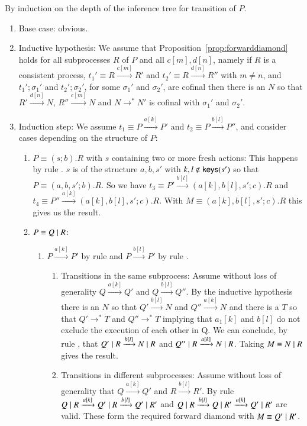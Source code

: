\begin{pf}
By induction on the depth of the inference tree for transition of $P$.
\begin{enumerate}
\item Base case: obvious.
\item Inductive hypothesis: We assume that Proposition~\ref{prop:forwarddiamond} holds for all 
subprocesses $R$ of $P$ and all $c[m], d[n]$, namely if $R$ is a consistent process, 
$t_1' \equiv R \xrightarrow{c[m]} R'$ and $t_2' \equiv R \xrightarrow{d[n]} R''$ with $m \neq n$, 
and $t_1';\sigma_1'$ and $t_2';\sigma_2'$, for some $\sigma_1'$ and $\sigma_2'$, are cofinal  then there is an $N$ so that $R' \xrightarrow{d[n]} N$, $R'' \xrightarrow{c[m]} N$ and $N \rightarrow^* N'$ is cofinal with $\sigma_1'$ and $\sigma_2'$.
\item Induction step:  We assume $t_1 \equiv P \xrightarrow{a[k]} P'$ and 
$t_2 \equiv P \xrightarrow{b[l]} P''$, and consider cases depending on the structure of $P$:
\begin{enumerate}
\item $P\equiv (s;b).R$ with $s$ containing two or more fresh actions: This happens by rule . $s$ is
of the structure $a,b,s'$ with $k,l \notin \mathsf{keys}(s')$ so that $P\equiv (a,b,s';b).R$. So we have 
$t_3 \equiv P' \xrightarrow{b[l]} (a[k],b[l],s';c).R$ and $t_4 \equiv P'' \xrightarrow{a[k]} 
(a[k],b[l],s';c).R$. With $M \equiv (a[k],b[l],s';c).R$ this gives us the result.
\item $P\equiv Q \; \vert \; R$:
\begin{enumerate}
\item $P \xrightarrow{a[k]} P'$ by rule  and $P \xrightarrow{b[l]} P'$ by rule . 
\begin{enumerate}
\item Transitions in the same subprocess: Assume without loss of generality $Q \xrightarrow{a[k]} Q'$ and $Q \xrightarrow{b[l]} Q''$. By the inductive hypothesis there is an $N$ so that $Q' \xrightarrow{b[l]} N$ and $Q'' \xrightarrow{a[k]} N$ and there is a $T$ so that $Q' \rightarrow^* T$ and $Q'' \rightarrow^* T$ implying that $a_1[k]$ and $b[l]$ do not exclude the execution of each other in Q. We can conclude,
by rule , that $Q' \; \vert \; R \xrightarrow{b[l]} N \; \vert \; R$ and $Q'' \; \vert \; R \xrightarrow{a[k]} N \; \vert \; R$. Taking $M \equiv N \; \vert \; R$ gives the result.
\item Transitions in different subprocesses: Assume without loss of generality that $Q \xrightarrow{a[k]} Q'$ and $R \xrightarrow{b[l]} R'$. By rule  $Q \; \vert \; R \xrightarrow{a[k]} Q' \; \vert \; R \xrightarrow{b[l]} Q' \; \vert \; R'$ and $Q \; \vert \; R \xrightarrow{b[l]} Q \; \vert \; R' \xrightarrow{a[k]} Q' \; \vert \; R'$ are valid. These form the required forward diamond with $M \equiv Q' \; \vert \; R'$.

\end{enumerate}
\end{enumerate}
\end{enumerate}
\end{enumerate}
\end{pf}
